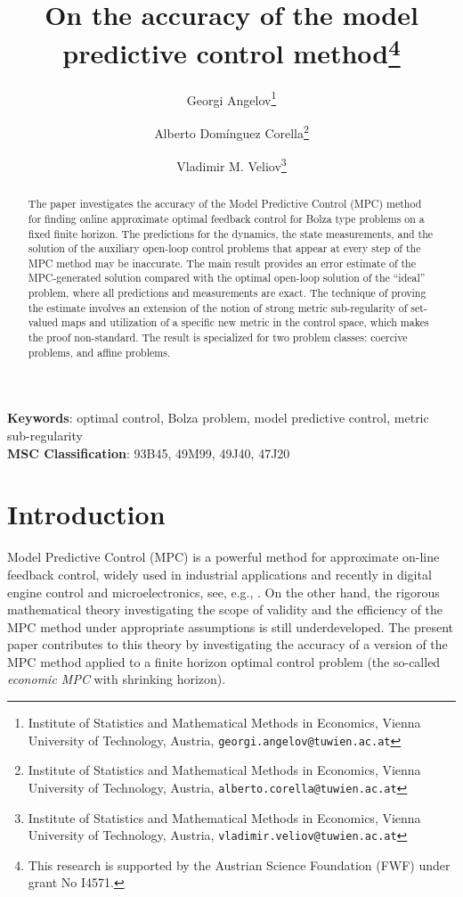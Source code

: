 \documentclass[11pt]{article}
\title{On the accuracy of the model predictive control method\thanks{This research is supported by 
the Austrian Science Foundation (FWF) under grant No I4571.}}
\author{
Georgi Angelov\thanks{Institute of Statistics and Mathematical Methods in Economics,
Vienna University of Technology, Austria, {\tt georgi.angelov@tuwien.ac.at}} 
\and  
Alberto Dom\'inguez Corella\thanks{Institute of Statistics and Mathematical Methods in Economics,
Vienna University of Technology, Austria, {\tt alberto.corella@tuwien.ac.at}} 
\and  
Vladimir M. Veliov\thanks{Institute of Statistics and Mathematical Methods in Economics,
Vienna University of Technology, Austria, {\tt vladimir.veliov@tuwien.ac.at}} }
\date{}
\begin{document}
	\maketitle

\begin{abstract}
The paper investigates the accuracy of the Model Predictive Control (MPC) method for finding online approximate optimal feedback control for Bolza type problems on a fixed finite horizon. The predictions for the dynamics, the state measurements, and the solution of the auxiliary open-loop control
problems that appear at every step of the MPC method may be inaccurate. The main result provides an error estimate of the MPC-generated solution compared with the optimal open-loop solution of the “ideal”
problem, where all predictions and measurements are exact. The technique of proving the estimate involves an extension of the notion of strong metric sub-regularity of set-valued maps and utilization of a
specific new metric in the control space, which makes the proof non-standard. The result is specialized
for two problem classes: coercive problems, and affine problems.
\end{abstract}
\medskip

{\bf Keywords}: optimal control, Bolza problem, model predictive control, metric sub-regularity \\

{\bf MSC Classification}: 93B45, 49M99, 49J40, 47J20

\section{Introduction} \label{SIntro}

Model Predictive Control (MPC) is a powerful method for approximate on-line feedback control, widely used in 
industrial applications and recently  in digital engine control and microelectronics, see, e.g., 
\cite{G+P-11,MPOC_HB-18,Wolf-16}. On the other hand, the rigorous mathematical theory investigating 
the scope of validity and the efficiency of the MPC method under appropriate 
assumptions is still underdeveloped. The present paper contributes to this theory by investigating the accuracy of a version
of the MPC method applied to a finite horizon optimal control problem (the so-called {\em economic MPC} with shrinking 
horizon). 
\end{document}
